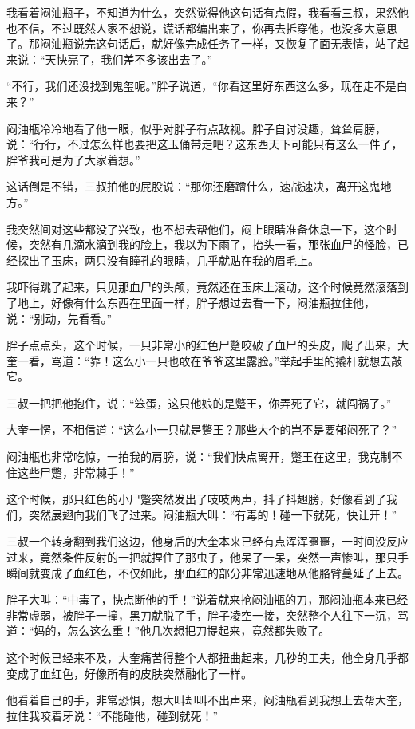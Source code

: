 我看着闷油瓶子，不知道为什么，突然觉得他这句话有点假，我看看三叔，果然他也不信，不过既然人家不想说，谎话都编出来了，你再去拆穿他，也没多大意思了。那闷油瓶说完这句话后，就好像完成任务了一样，又恢复了面无表情，站了起来说：“天快亮了，我们差不多该出去了。”

“不行，我们还没找到鬼玺呢。”胖子说道，“你看这里好东西这么多，现在走不是白来？”

闷油瓶冷冷地看了他一眼，似乎对胖子有点敌视。胖子自讨没趣，耸耸肩膀，说：“行行，不过怎么样也要把这玉俑带走吧？这东西天下可能只有这么一件了，胖爷我可是为了大家着想。”

这话倒是不错，三叔拍他的屁股说：“那你还磨蹭什么，速战速决，离开这鬼地方。”

我突然间对这些都没了兴致，也不想去帮他们，闷上眼睛准备休息一下，这个时候，突然有几滴水滴到我的脸上，我以为下雨了，抬头一看，那张血尸的怪脸，已经探出了玉床，两只没有瞳孔的眼睛，几乎就贴在我的眉毛上。

我吓得跳了起来，只见那血尸的头颅，竟然还在玉床上滚动，这个时候竟然滚落到了地上，好像有什么东西在里面一样，胖子想过去看一下，闷油瓶拉住他，说：“别动，先看看。”

胖子点点头，这个时候，一只非常小的红色尸蹩咬破了血尸的头皮，爬了出来，大奎一看，骂道：“靠！这么小一只也敢在爷爷这里露脸。”举起手里的撬杆就想去敲它。

三叔一把把他抱住，说：“笨蛋，这只他娘的是蹩王，你弄死了它，就闯祸了。”

大奎一愣，不相信道：“这么小一只就是蹩王？那些大个的岂不是要郁闷死了？”

闷油瓶也非常吃惊，一拍我的肩膀，说：“我们快点离开，蹩王在这里，我克制不住这些尸蹩，非常棘手！”

这个时候，那只红色的小尸蹩突然发出了吱吱两声，抖了抖翅膀，好像看到了我们，突然展翅向我们飞了过来。闷油瓶大叫：“有毒的！碰一下就死，快让开！”

三叔一个转身翻到我们这边，他身后的大奎本来已经有点浑浑噩噩，一时间没反应过来，竟然条件反射的一把就捏住了那虫子，他呆了一呆，突然一声惨叫，那只手瞬间就变成了血红色，不仅如此，那血红的部分非常迅速地从他胳臂蔓延了上去。

胖子大叫：“中毒了，快点断他的手！”说着就来抢闷油瓶的刀，那闷油瓶本来已经非常虚弱，被胖子一撞，黑刀就脱了手，胖子凌空一接，突然整个人往下一沉，骂道：“妈的，怎么这么重！”他几次想把刀提起来，竟然都失败了。

这个时候已经来不及，大奎痛苦得整个人都扭曲起来，几秒的工夫，他全身几乎都变成了血红色，好像所有的皮肤突然融化了一样。

他看着自己的手，非常恐惧，想大叫却叫不出声来，闷油瓶看到我想上去帮大奎，拉住我咬着牙说：“不能碰他，碰到就死！”


